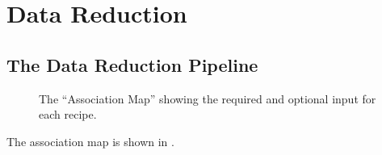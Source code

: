 \section{Data Reduction}
\label{sec:datareduction}


\subsection{The \instrument{} Data Reduction Pipeline}
\label{sec:datareduction-pipeline}

\begin{figure}[!tb]
  \begin{center}
  \end{center}
  \caption{
    \label{fig:association-map}
    The \instrument{} ``Association Map'' showing the required and optional
    input for each recipe.}
\end{figure}

The \instrument{} association map is shown in .
